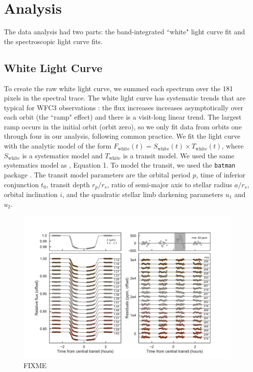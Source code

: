 \documentclass[twocolumn]{aastex61}
\begin{document}
\section{Analysis}
The data analysis had two parts: the band-integrated ``white" light curve fit and the spectroscopic light curve fits.

\subsection{White Light Curve}
To create the raw white light curve, we summed each spectrum over the 181 pixels in the spectral trace.  The white light curve has systematic trends that are typical for WFC3 observations \citep{zhou17}: the flux increases increases asymptotically over each orbit (the ``ramp" effect) and there is a visit-long linear trend. The largest ramp occurs in the initial orbit (orbit zero), so we only fit data from orbits one through four in our analysis, following common practice.  We fit the light curve with the analytic model of the form $F_\mathrm{white}(t) = S_\mathrm{white}(t)\times T_\mathrm{white}(t)$, where $S_\mathrm{white}$ is a systematics model and $T_\mathrm{white}$ is a transit model. We used the same systematics model as \cite{kreidberg15b}, Equation 1.  To model the transit, we used the \texttt{batman} package \citep{kreidberg15a}.  The transit model parameters are the orbital period $p$, time of inferior conjunction $t_0$, transit depth $r_p/r_s$, ratio of semi-major axis to stellar radius $a/r_s$, orbital inclination $i$, and the quadratic stellar limb darkening parameters $u_1$ and $u_2$.

\begin{figure}
\includegraphics[width = \textwidth]{Figures/lc.pdf}
\caption{FIXME}
\label{fig:lc}
\end{figure}
\end{document}
